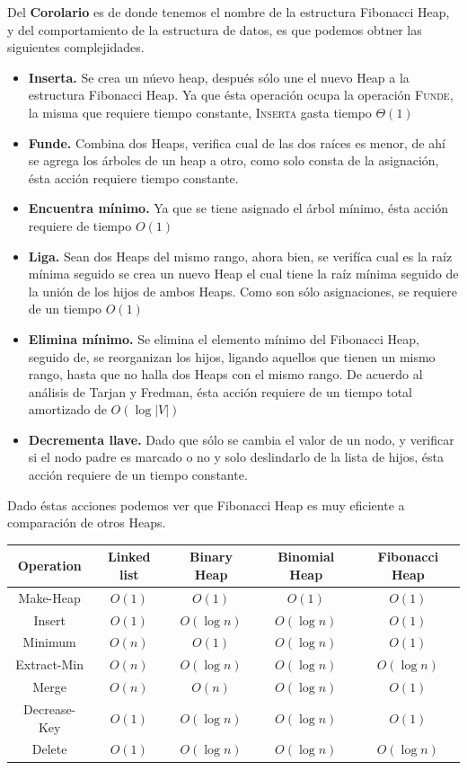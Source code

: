 \documentclass[a4paper, titlepage, 12pt]{article}
\theoremstyle{definition}%
\theoremstyle{Teorema}
\theoremstyle{break}
\begin{document}
Del \textbf{Corolario} es de donde tenemos el nombre de la estructura Fibonacci Heap, y del comportamiento de la estructura de datos, es que podemos obtner las 
siguientes complejidades.\cite{Amortizado}
\begin{itemize}
  \item \textbf{Inserta.} Se crea un núevo heap, después sólo une el nuevo Heap a la estructura Fibonacci Heap. Ya que ésta operación 
  ocupa la operación \textsc{Funde}, la misma que requiere tiempo constante, \textsc{Inserta} gasta tiempo $\Theta(1)$
  \item \textbf{Funde.} Combina dos Heaps, verifica cual de las dos raíces es menor, de ahí se agrega los árboles de un heap a otro, como solo 
  consta de la asignación, ésta acción requiere tiempo constante.
  \item \textbf{Encuentra mínimo.} Ya que se tiene asignado el árbol mínimo, ésta acción requiere de tiempo $O(1)$
  \item \textbf{Liga.} Sean dos Heaps del mismo rango, ahora bien, se verifíca cual es la raíz mínima seguido se crea un nuevo Heap el cual tiene la raíz mínima 
  seguido de la unión de los hijos de ambos Heaps. Como son sólo asignaciones, se requiere de un tiempo $O(1)$
  \item \textbf{Elimina mínimo.} Se elimina el elemento mínimo del Fibonacci Heap, seguido de, se reorganizan los hijos, ligando aquellos que tienen un mismo rango, 
  hasta que no halla dos Heaps con el mismo rango. De acuerdo al análisis de Tarjan y Fredman, ésta acción requiere de un tiempo total amortizado de $O(\log|V|)$
  \item \textbf{Decrementa llave.} Dado que sólo se cambia el valor de un nodo, y verificar si el nodo padre es marcado o no y solo deslindarlo de la lista de hijos, 
  ésta acción requiere de un tiempo constante.  
\end{itemize}

Dado éstas acciones podemos ver que Fibonacci Heap es muy eficiente a comparación de otros Heaps.\cite{Comparaciones}
\begin{table}[h]
  \centering
  \begin{tabular}{c|cccc}
    \rowcolor{LightBlue2} Operation & Linked list & Binary Heap & Binomial Heap & Fibonacci Heap\\\hline
    Make-Heap & $O(1)$ & $O(1)$ & $O(1)$ & $O(1)$ \\
    Insert & $O(1)$ & $O(\log n)$ & $O(\log n)$ & $O(1)$\\
    Minimum & $O(n)$ & $O(1)$ & $O(\log n)$ & $O(1)$\\
    Extract-Min & $O(n)$ & $O(\log n)$ & $O(\log n)$ & $O(\log n)$\\
    Merge & $O(n)$ & $O(n)$ & $O(\log n)$ & $O(1)$\\
    Decrease-Key & $O(1)$ & $O(\log n)$ & $O(\log n)$ & $O(1)$\\
    Delete & $O(1)$ & $O(\log n)$ & $O(\log n)$ & $O(\log n)$
  \end{tabular}
\end{table}
\end{document}
